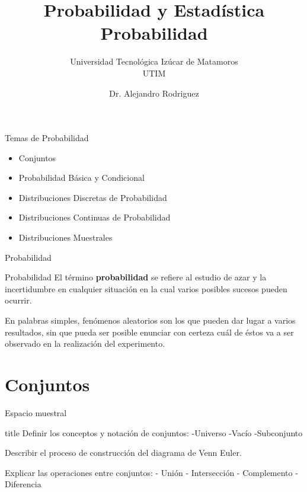 \documentclass[11pt]{beamer}
\author{Dr. Alejandro Rodriguez}
\title{Probabilidad y Estad\'istica\\Probabilidad}
\subtitle{Universidad Tecnol\'ogica Iz\'ucar de Matamoros\\UTIM }
\begin{document}
    \begin{frame}[plain]
        \maketitle
    \end{frame}

    \begin{frame}{Temas de Probabilidad}
      \begin{itemize}
          \item Conjuntos
          \item Probabilidad Básica y Condicional
          \item Distribuciones Discretas de Probabilidad
          \item Distribuciones Continuas de Probabilidad
          \item Distribuciones Muestrales
      \end{itemize}
    \end{frame}
    \begin{frame}{Probabilidad}
       \begin{block}{Probabilidad}
           El término \textbf{probabilidad} se refiere al estudio de azar y la incertidumbre en cualquier
           situación en la cual varios posibles sucesos pueden ocurrir.
       \end{block}
       \pause
       En palabras simples, fenómenos aleatorios son los que pueden dar lugar a varios resultados, sin que pueda ser posible enunciar con certeza cuál de éstos va a ser observado en la realización del experimento.
    \end{frame}



    \section*{Conjuntos}
      \begin{frame}{Espacio muestral}
          \begin{block}{title}
              Definir los conceptos y notación de conjuntos:
              -Universo
              -Vacío
              -Subconjunto

              Describir el proceso de construcción del diagrama de Venn Euler.

              Explicar las operaciones entre conjuntos:
              - Unión
              - Intersección
              - Complemento
              - Diferencia
          \end{block}
      \end{frame}
\end{document}
